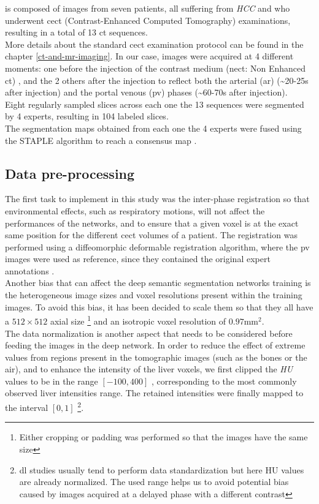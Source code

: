 \textbf{} is composed of images from seven patients, all suffering
from \emph{HCC} and who underwent \ac{cect} (Contrast-Enhanced
Computed Tomography) examinations, resulting in a total of 13 \ac{ct}
sequences. \\
More details about the standard \ac{cect} examination protocol can be
found in the chapter \ref{ct-and-mr-imaging}. In our case, images were acquired at 4 different
moments: one before the injection of the contrast medium (\ac{nect}:
Non Enhanced \ac{ct}) , and the 2 others after the injection to reflect both
the arterial (\ac{ar}) (\textasciitilde{}20-25s after injection) and
the portal venous (\ac{pv}) phases (\textasciitilde{}60-70s after
injection).\\
Eight regularly sampled slices across each one the 13 sequences were
segmented by 4 experts, resulting in 104 labeled slices. \\
The segmentation maps obtained from each one the 4 experts were fused
using the STAPLE algorithm to reach a consensus map \cite{Warfield2004}.

\subsection{Data pre-processing}

The first task to implement in this study was the inter-phase
registration so that environmental effects, such as respiratory motions,
will not affect the performances of the networks, and to ensure that a
given voxel is at the exact same position for the different \ac{cect}
volumes of a patient. The registration was performed using a
diffeomorphic deformable registration algorithm, where the \ac{pv}
images were used as reference, since they contained the original expert
annotations \cite{Avants2008, Conze2017, Ben-Cohen, Christ2017}. \\
Another bias that can affect the deep semantic segmentation networks
training is the heterogeneous image sizes and voxel resolutions present
within the training images.
To avoid this bias, it has been decided to scale them so that they all
have a $ 512\times512 $ axial size \footnote{Either cropping or padding was performed so that the images have the same size} and an isotropic voxel resolution of $ 0.97 \text{mm}^2 $. \\
The data normalization is another aspect that needs to be considered
before feeding the images in the deep network. In order to reduce the
effect of extreme values from regions present in the tomographic images
(such as the bones or the air), and to enhance the intensity of the
liver voxels, we first clipped the \emph{HU} values to be in the range
$ \left[-100, 400\right] $ , corresponding to the most commonly 
observed liver intensities range. The retained intensities were finally mapped to
the interval $ \left[0, 1\right]$ \footnote{\ac{dl} studies usually tend to perform 
data standardization but here HU values are already normalized. 
The used range helps us to avoid potential bias caused by images acquired at a delayed phase with a different contrast}.

